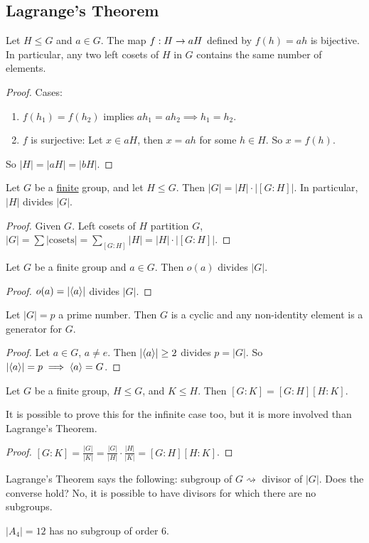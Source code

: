 \documentclass[]{article}
\begin{document}
\subsection{Lagrange's Theorem}

\begin{proposition}
	Let $H\leq G$ and $a\in G$. The map $f: H\rightarrow aH$ defined by $f(h) = ah$ is bijective.
	In particular, any two left cosets of $H$ in $G$ contains the same number of elements.
\end{proposition}
\begin{proof}
	Cases:
	\begin{enumerate}
		\item 
		$f(h_1) = f(h_2)$ implies $ah_1 = ah_2\implies h_1 = h_2$.
		\item 
		$f$ is surjective: Let $x\in aH$, then $x = ah$ for some $h\in H$. So $x = f(h)$.
	\end{enumerate}
	So $|H| = |aH| = |bH|$.
\end{proof}
\begin{theorem}
	Let $G$ be a \ul{finite} group, and let $H\leq G$. Then $|G| = |H|\cdot|[G:H]|$.
	In particular, $|H|$ divides $|G|$.
\end{theorem}
\begin{proof}
	Given $G$.
	Left cosets of $H$ partition $G$, $|G| = \sum |\text{cosets}| = \sum_{[G:H]} |H| = |H|\cdot|[G:H]|$.
\end{proof}
\begin{corollary}
	Let $G$ be a finite group and $a\in G$. Then $o(a)$ divides $|G|$.
\end{corollary}
\begin{proof}
	$o(a) = |\langle a \rangle|$ divides $|G|$.
\end{proof}
\begin{corollary}
	Let $|G| = p$ a prime number. Then $G$ is a cyclic and any non-identity element is a generator for $G$.
\end{corollary}
\begin{proof}
	Let $a\in G$, $a\neq e$. Then $|\langle a \rangle|\geq 2$ divides $p = |G|$. So $|\langle a \rangle| = p \implies \langle a \rangle = G$.
\end{proof}
\begin{proposition}
	Let $G$ be a finite group, $H\leq G$, and $K\leq H$. Then $[G:K]=[G:H][H:K]$.
\end{proposition}
\begin{remark}
	It is possible to prove this for the infinite case too, but it is more involved than Lagrange's Theorem.
\end{remark}
\begin{proof}
	$[G:K] = \frac{|G|}{|K|} = \frac{|G|}{|H|}\cdot\frac{|H|}{|K|} = [G:H][H:K]$.
\end{proof}
\begin{remark}
	Lagrange's Theorem says the following: subgroup of $G \rightsquigarrow$ divisor of $|G|$. Does the converse hold? No, it is possible to have divisors for which there are no subgroups.
\end{remark}
\begin{example}
	$|A_4| = 12$ has no subgroup of order 6.
\end{example}
\end{document}
